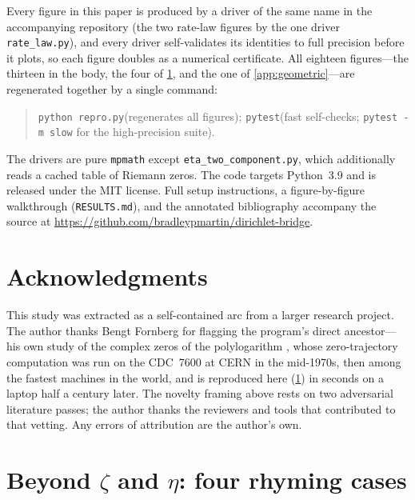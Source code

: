 \documentclass[11pt]{article}
\theoremstyle{definition}
\begin{document}
Every figure in this paper is produced by a driver of the same name in the
accompanying repository (the two rate-law figures by the one driver
\texttt{rate\_law.py}), and every driver self-validates its identities to full
precision before it plots, so each figure doubles as a numerical certificate. All
eighteen figures---the thirteen in the body, the four of \cref{app:beyond}, and the
one of \cref{app:geometric}---are regenerated together by a single command:
\begin{quote}
\texttt{python repro.py}\quad(regenerates all figures);\qquad
\texttt{pytest}\quad(fast self-checks; \texttt{pytest -m slow} for the
high-precision suite).
\end{quote}
The drivers are pure \texttt{mpmath} except \texttt{eta\_two\_component.py}, which
additionally reads a cached table of Riemann zeros. The code targets Python~3.9
and is released under the MIT license. Full setup instructions, a
figure-by-figure walkthrough (\texttt{RESULTS.md}), and the annotated
bibliography accompany the source at
\url{https://github.com/bradleypmartin/dirichlet-bridge}.

\section*{Acknowledgments}
This study was extracted as a self-contained arc from a larger research project.
The author thanks Bengt Fornberg for flagging the program's direct ancestor---his
own study of the complex zeros of the polylogarithm \citep{FornbergKolbig1975},
whose zero-trajectory computation was run on the CDC~7600 at CERN in the
mid-1970s, then among the fastest machines in the world, and is reproduced here
(\cref{app:beyond}) in seconds on a laptop half a century later. The novelty
framing above rests on two adversarial literature passes; the author thanks the
reviewers and tools that contributed to that vetting. Any errors of attribution
are the author's own.

\appendix
\section{Beyond $\zeta$ and $\eta$: four rhyming cases}\label{app:beyond}
\end{document}
